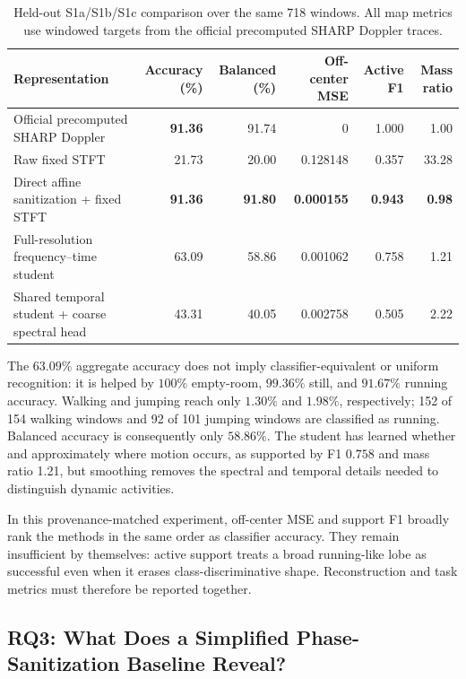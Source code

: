 \begin{table}[t]
\centering
\caption{Held-out S1a/S1b/S1c comparison over the same 718 windows. All map
metrics use windowed targets from the official precomputed SHARP Doppler
traces.}
\label{tab:main-results}
\footnotesize
\setlength{\tabcolsep}{5pt}
\begin{tabular}{@{}lrrrrr@{}}
\hline
Representation & Accuracy (\%) & Balanced (\%) & Off-center MSE & Active F1 &
Mass ratio \\
\hline
Official precomputed SHARP Doppler & \textbf{91.36} & 91.74 & 0 & 1.000 & 1.00 \\
Raw fixed STFT & 21.73 & 20.00 & 0.128148 & 0.357 & 33.28 \\
Direct affine sanitization + fixed STFT & \textbf{91.36} & \textbf{91.80} & \textbf{0.000155} & \textbf{0.943} & \textbf{0.98} \\
Full-resolution frequency--time student & 63.09 & 58.86 & 0.001062 & 0.758 & 1.21 \\
Shared temporal student + coarse spectral head & 43.31 & 40.05 & 0.002758 & 0.505 & 2.22 \\
\hline
\end{tabular}
\end{table}

The \(63.09\%\) aggregate accuracy does not imply classifier-equivalent or
uniform recognition: it is helped by \(100\%\) empty-room, \(99.36\%\) still,
and \(91.67\%\) running accuracy. Walking and jumping reach only \(1.30\%\) and
\(1.98\%\), respectively; 152 of 154 walking windows and 92 of 101 jumping
windows are classified as running. Balanced accuracy is consequently only
\(58.86\%\). The student has learned whether and approximately where motion
occurs, as supported by F1 \(0.758\) and mass ratio 1.21, but smoothing removes
the spectral and temporal details needed to distinguish dynamic activities.

In this provenance-matched experiment, off-center MSE and support F1 broadly
rank the methods in the same order as classifier accuracy. They remain
insufficient by themselves: active support treats a broad running-like lobe as
successful even when it erases class-discriminative shape. Reconstruction and
task metrics must therefore be reported together.

\subsection{RQ3: What Does a Simplified Phase-Sanitization Baseline Reveal?}


